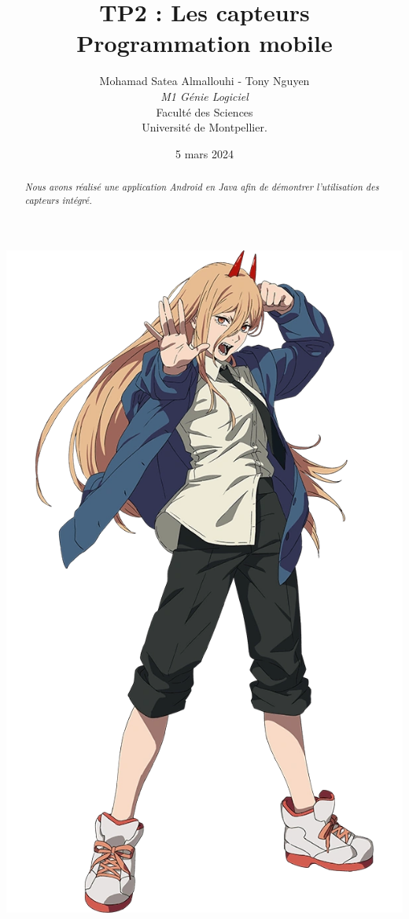 \documentclass[a4paper]{article}
\title{  TP2 : Les capteurs\\Programmation mobile}
\author{Mohamad Satea Almallouhi - Tony Nguyen\\\emph{M1 Génie Logiciel}\\Faculté des Sciences\\Université de Montpellier.}
\date{5 mars 2024}
\begin{document}
    \maketitle
    \begin{center}
        \includegraphics[height=.95\textwidth]{power}
    \end{center}

    \begin{abstract}     %
      \emph{Nous avons réalisé une application Android en Java afin de démontrer l'utilisation des capteurs intégré.}
    \end{abstract}
    \newpage
    \tableofcontents
\end{document}
